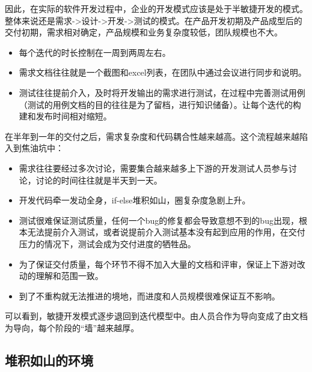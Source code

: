 \documentclass[12pt]{article}
\begin{document}
因此，在实际的软件开发过程中，企业的开发模式应该是处于半敏捷开发的模式。整体来说还是需求->设计->开发->测试的模式。在产品开发初期及产品成型后的交付初期，需求相对确定，产品规模和业务复杂度较低，团队规模也不大。

\begin{itemize}
\setlength{\itemsep}{0pt}
\setlength{\parsep}{0pt}
\setlength{\parskip}{0pt}
    \item 每个迭代的时长控制在一周到两周左右。

    \item 需求文档往往就是一个截图和excel列表，在团队中通过会议进行同步和说明。
    
    \item 测试往往提前介入，及时将开发输出的需求进行测试，在过程中完善测试用例（测试的用例文档的目的往往是为了留档，进行知识储备）。让每个迭代的构建和发布时间相对缩短。
\end{itemize}

在半年到一年的交付之后，需求复杂度和代码耦合性越来越高。这个流程越来越陷入到焦油坑中：
\begin{itemize}
\setlength{\itemsep}{0pt}
\setlength{\parsep}{0pt}
\setlength{\parskip}{0pt}
    \item 需求往往要经过多次讨论，需要集合越来越多上下游的开发测试人员参与讨论，讨论的时间往往就是半天到一天。

    \item 开发代码牵一发动全身，if-else堆积如山，圈复杂度急剧上升。
    
    \item 测试很难保证测试质量，任何一个bug的修复都会导致意想不到的bug出现，根本无法提前介入测试，或者说提前介入测试基本没有起到应用的作用，在交付压力的情况下，测试会成为交付进度的牺牲品。
    
   \item 为了保证交付质量，每个环节不得不加入大量的文档和评审，保证上下游对改动的理解和范围一致。
   
   \item 到了不重构就无法推进的境地，而进度和人员规模很难保证互不影响。
\end{itemize}

可以看到，敏捷开发模式逐步退回到迭代模型中。由人员合作为导向变成了由文档为导向，每个阶段的“墙”越来越厚。

\subsection{堆积如山的环境}
\end{document}
